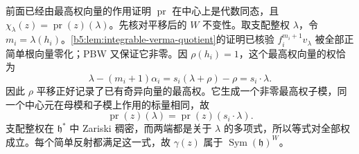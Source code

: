 \begin{proofsketch}
	前面已经由最高权向量的作用证明 \(\operatorname{pr}\) 在中心上是代数同态，且 \(\chi_\lambda(z)=\operatorname{pr}(z)(\lambda)\)。先核对平移后的 \(W\) 不变性。取支配整权 \(\lambda\)，令 \(m_i=\lambda(h_i)\)。\cref{b5:lem:integrable-verma-quotient}的证明已核验 \(f_i^{m_i+1}v_\lambda\) 被全部正简单根向量零化；PBW 又保证它非零。因 \(\rho(h_i)=1\)，这个最高权向量的权恰为
	\[
		\lambda-(m_i+1)\alpha_i =s_i(\lambda+\rho)-\rho=s_i\mathbin{\cdot}\lambda.
	\]
	因此 \(\rho\) 平移正好记录了已有奇异向量的最高权。它生成一个非零最高权子模，同一个中心元在母模和子模上作用的标量相同，故
	\[
		\operatorname{pr}(z)(\lambda) =\operatorname{pr}(z)(s_i\mathbin{\cdot}\lambda).
	\]
	支配整权在 \(\mathfrak h^*\) 中 Zariski 稠密，而两端都是关于 \(\lambda\) 的多项式，所以等式对全部权成立。每个简单反射都满足这一式，故 \(\gamma(z)\) 属于 \(\operatorname{Sym}(\mathfrak h)^W\)。


\end{proofsketch}
